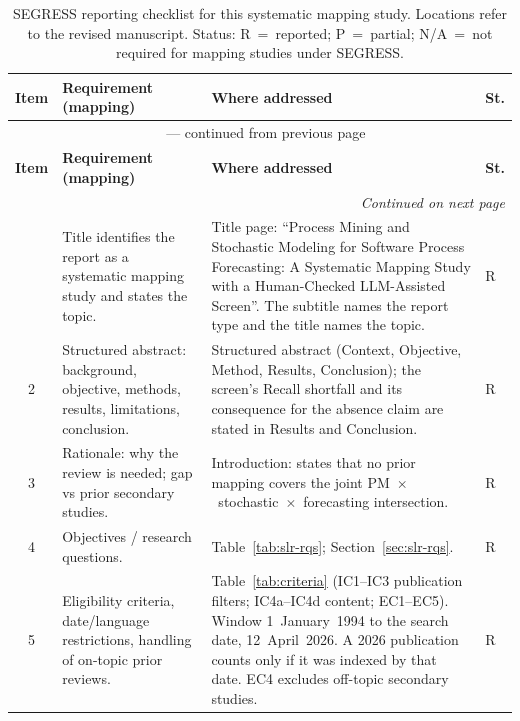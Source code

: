 
\begin{longtable}{c p{4.4cm} p{6.6cm} l}
\caption{SEGRESS reporting checklist for this systematic mapping study.
Locations refer to the revised manuscript. Status: R~=~reported;
P~=~partial; N/A~=~not required for mapping studies under SEGRESS.}
\label{tab:segress-checklist}\\
\toprule
\textbf{Item} & \textbf{Requirement (mapping)} & \textbf{Where addressed} & \textbf{St.} \\
\midrule
\endfirsthead
\multicolumn{4}{c}{\tablename\ \thetable{} --- continued from previous page}\\
\toprule
\textbf{Item} & \textbf{Requirement (mapping)} & \textbf{Where addressed} & \textbf{St.} \\
\midrule
\endhead
\midrule
\multicolumn{4}{r}{\emph{Continued on next page}}\\
\endfoot
\bottomrule
\endlastfoot
1 & Title identifies the report as a systematic mapping study and states the topic. & Title page: ``Process Mining and Stochastic Modeling for Software Process Forecasting: A Systematic Mapping Study with a Human-Checked LLM-Assisted Screen''. The subtitle names the report type and the title names the topic. & R \\
2 & Structured abstract: background, objective, methods, results, limitations, conclusion. & Structured abstract (Context, Objective, Method, Results, Conclusion); the screen's Recall shortfall and its consequence for the absence claim are stated in Results and Conclusion. & R \\
3 & Rationale: why the review is needed; gap vs prior secondary studies. & Introduction: states that no prior mapping covers the joint PM~$\times$~stochastic~$\times$~forecasting intersection. & R \\
4 & Objectives / research questions. & Table~\ref{tab:slr-rqs}; Section~\ref{sec:slr-rqs}. & R \\
5 & Eligibility criteria, date/language restrictions, handling of on-topic prior reviews. & Table~\ref{tab:criteria} (IC1--IC3 publication filters; IC4a--IC4d content; EC1--EC5). Window 1~January~1994 to the search date, 12~April~2026. A 2026 publication counts only if it was indexed by that date. EC4 excludes off-topic secondary studies. & R \\

\end{longtable}
